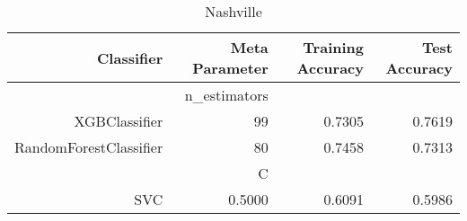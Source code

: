 
\begin{table}[H]
    \caption{Nashville}
    \centering
    \begin{tabular}{|r|r|r|r|}
        \hline
        Classifier &Meta Parameter &Training Accuracy
        &Test Accuracy\\
        \hline
        &n\_estimators &\multicolumn{2}{|r|}{}\\
        \hline
        XGBClassifier &99 &0.7305 &0.7619\\
        \hline
        RandomForestClassifier &80 &0.7458 &0.7313\\
        \hline
        &C &\multicolumn{2}{|r|}{}\\
        \hline
        SVC &0.5000 &0.6091 &0.5986\\
        \hline
    \end{tabular}
\end{table}
